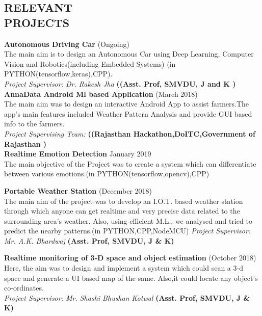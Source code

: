 \documentclass[margin]{res}
\begin{document}
\begin{resume}
\section{RELEVANT \\ PROJECTS} 
\textbf{Autonomous Driving Car } \hfill (Ongoing)\\
The main aim is to design an Autonomous Car using Deep Learning, Computer Vision and Robotics(including Embedded Systems) (in PYTHON(tensorflow,keras),CPP).\\ 
\textsl{Project Supervisor: Dr. Rakesh Jha }\textbf{((Asst. Prof, SMVDU, J and K  )}\vspace{0.15in}\\ 
\textbf{AnnaData Android Ml based Application } \hfill (March 2018)\\
The main aim was to design an interactive  Android App to assist farmers.The app's main features included Weather Pattern Analysis and provide GUI based info to the farmers.\\ 
\textsl{Project Supervising Team: }\textbf{((Rajasthan Hackathon,DoITC,Government of Rajasthan )}\vspace{0.15in}\\ 
\textbf{Realtime Emotion Detection} \hfill January 2019\\
The main objective of the Project was to create a system which can differentiate between various emotions.(in PYTHON(tensorflow,opencv),CPP)\

\textbf{Portable Weather Station} \hfill (December 2018)\\
The main aim of the project was to develop an I.O.T. based weather station through which anyone can get realtime and very precise data related to the surrounding area's weather. Also, using efficient M.L., we analysed and tried to predict the nearby patterns.(in PYTHON,CPP,NodeMCU)
\textsl{Project Supervisor: Mr. A.K. Bhardwaj} \textbf{(Asst. Prof, SMVDU, J \& K)}

\textbf{Realtime monitoring of 3-D space and object  estimation} \hfill (October 2018)\\
Here, the aim was to design and implement a system which could scan a 3-d space and generate a UI based map of the same. Also,it could locate any object's co-ordinates.\\
\textsl{Project Supervisor: Mr. Shashi Bhushan Kotwal} \textbf{(Asst. Prof, SMVDU, J \& K)}




\end{resume}
\end{document}

